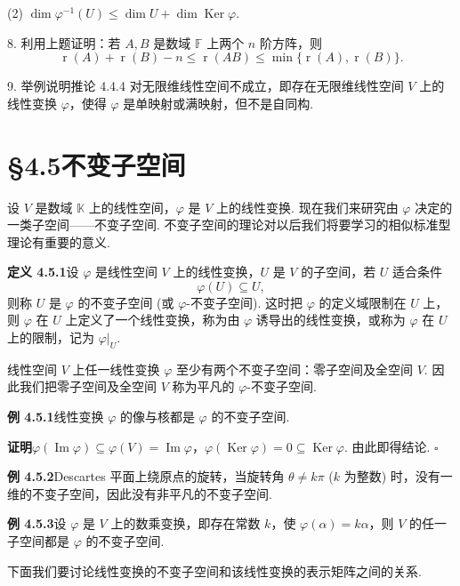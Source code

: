 \documentclass[UTF8, 12pt, fontset=fandol, oneside]{ctexart}
\begin{document}
(2) $\dim\varphi^{-1}(U)\leq \dim U+\dim\operatorname{Ker}\varphi$.

8. 利用上题证明：若 $A,B$ 是数域 $\mathbb{F}$ 上两个 $n$ 阶方阵，则
\[
\operatorname{r}(A)+\operatorname{r}(B)-n\leq \operatorname{r}(AB)\leq \min\{\operatorname{r}(A),\operatorname{r}(B)\}.
\]

9. 举例说明推论 4.4.4 对无限维线性空间不成立，即存在无限维线性空间 $V$ 上的线性变换 $\varphi$，使得 $\varphi$ 是单映射或满映射，但不是自同构.

\section*{§4.5\quad 不变子空间}

设 $V$ 是数域 $\mathbb{K}$ 上的线性空间，$\varphi$ 是 $V$ 上的线性变换. 现在我们来研究由 $\varphi$ 决定的一类子空间——不变子空间. 不变子空间的理论对以后我们将要学习的相似标准型理论有重要的意义.

\noindent\textbf{定义 4.5.1}\quad 设 $\varphi$ 是线性空间 $V$ 上的线性变换，$U$ 是 $V$ 的子空间，若 $U$ 适合条件
\[
\varphi(U)\subseteq U,
\]
则称 $U$ 是 $\varphi$ 的不变子空间 (或 $\varphi$-不变子空间). 这时把 $\varphi$ 的定义域限制在 $U$ 上，则 $\varphi$ 在 $U$ 上定义了一个线性变换，称为由 $\varphi$ 诱导出的线性变换，或称为 $\varphi$ 在 $U$ 上的限制，记为 $\varphi|_U$.

线性空间 $V$ 上任一线性变换 $\varphi$ 至少有两个不变子空间：零子空间及全空间 $V$. 因此我们把零子空间及全空间 $V$ 称为平凡的 $\varphi$-不变子空间.

\noindent\textbf{例 4.5.1}\quad 线性变换 $\varphi$ 的像与核都是 $\varphi$ 的不变子空间.

\noindent\textbf{证明}\quad $\varphi(\operatorname{Im}\varphi)\subseteq\varphi(V)=\operatorname{Im}\varphi$，$\varphi(\operatorname{Ker}\varphi)=0\subseteq\operatorname{Ker}\varphi$. 由此即得结论. $\square$

\noindent\textbf{例 4.5.2}\quad Descartes 平面上绕原点的旋转，当旋转角 $\theta\neq k\pi$ ($k$ 为整数) 时，没有一维的不变子空间，因此没有非平凡的不变子空间.

\noindent\textbf{例 4.5.3}\quad 设 $\varphi$ 是 $V$ 上的数乘变换，即存在常数 $k$，使 $\varphi(\alpha)=k\alpha$，则 $V$ 的任一子空间都是 $\varphi$ 的不变子空间.

下面我们要讨论线性变换的不变子空间和该线性变换的表示矩阵之间的关系.
\end{document}
